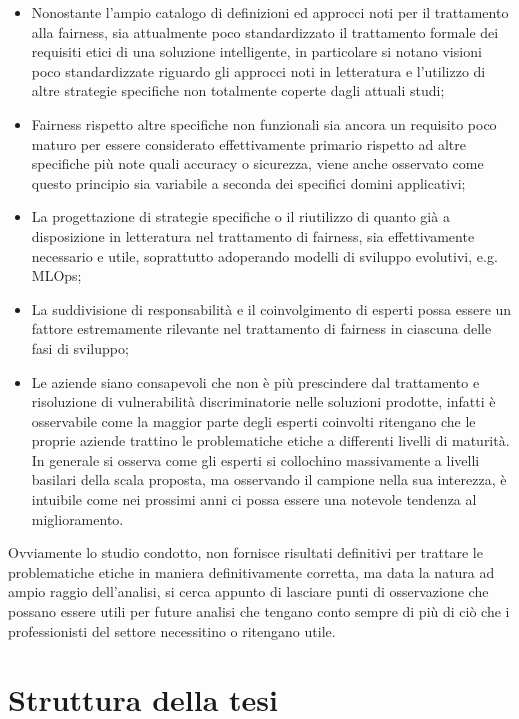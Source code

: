 \begin{itemize}
    \item Nonostante l'ampio catalogo di definizioni ed approcci noti per il trattamento alla fairness, sia attualmente poco standardizzato il trattamento formale dei requisiti etici di una soluzione intelligente, in particolare si notano visioni poco standardizzate riguardo gli approcci noti in letteratura e l'utilizzo di altre strategie specifiche non totalmente coperte dagli attuali studi;
    \item Fairness rispetto altre specifiche non funzionali sia ancora un requisito poco maturo per essere considerato effettivamente primario rispetto ad altre specifiche più note quali accuracy o sicurezza, viene anche osservato come questo principio sia variabile a seconda dei specifici domini applicativi;
    \item La progettazione di strategie specifiche o il riutilizzo di quanto già a disposizione in letteratura nel trattamento di fairness, sia effettivamente necessario e utile, soprattutto adoperando modelli di sviluppo evolutivi, e.g. MLOps;
    \item La suddivisione di responsabilità e il coinvolgimento di esperti possa essere un fattore estremamente rilevante nel trattamento di fairness in ciascuna delle fasi di sviluppo;
    \item Le aziende siano consapevoli che non è più prescindere dal trattamento e risoluzione di vulnerabilità discriminatorie nelle soluzioni prodotte, infatti è osservabile come la maggior parte degli esperti coinvolti ritengano che le proprie aziende trattino le problematiche etiche a differenti livelli di maturità. In generale si osserva come gli esperti si collochino massivamente a livelli basilari della scala proposta, ma osservando il campione nella sua interezza, è intuibile come nei prossimi anni ci possa essere una notevole tendenza al miglioramento. 
\end{itemize}
 
 Ovviamente lo studio condotto, non fornisce risultati definitivi per trattare le problematiche etiche in maniera definitivamente corretta, ma data la natura ad ampio raggio dell'analisi, si cerca appunto di lasciare punti di osservazione che possano essere utili per future analisi che tengano conto sempre di più di ciò che i professionisti del settore necessitino o ritengano utile.
\section{Struttura della tesi}

